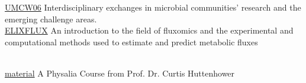 \documentclass[
    a4paper,
]{../fortysecondscv}
\begin{document}
\begin{cvtable}
        {\href{https://www.newton.ac.uk/event/umcw06/}{UMCW06}}
        {Interdisciplinary exchanges in microbial communities' research and the emerging challenge areas.}{}
    \\

    {\href{https://tess.elixir-europe.org/events/elixir-fluxomics-training-school-2021}{ELIXFLUX}}
    {An introduction to the field of fluxomics and the experimental and computational methods used to estimate and predict metabolic fluxes}{}

    \\

    {\href{https://docs.google.com/spreadsheets/d/1YwJWejTxh7FLfooKCEJ18QCqvkYKAe5jFtwqQ7qU7bI/edit?gid=674784997\#gid=674784997}{material}}
    {A Physalia Course from Prof. Dr. Curtis Huttenhower}{}

\end{cvtable}




    \begin{cvtable}
    
    \end{cvtable}



    \begin{cvtable}
        

    \end{cvtable}



\end{document}
